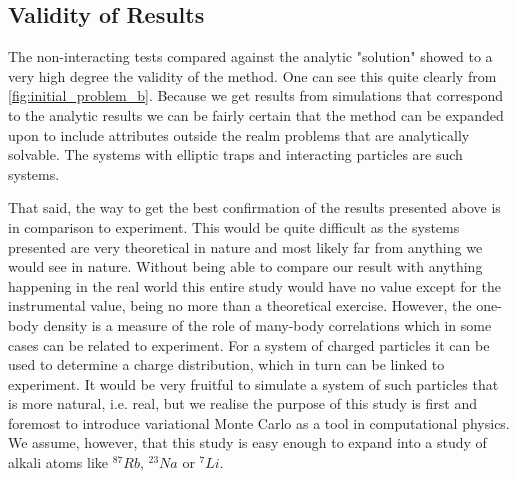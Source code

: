 \documentclass[
    a4paper, aps, twocolumn, floatfix, superscriptaddress,
    nofootinbib]{revtex4-1}
\newcommand{\1}{\mathds{1}}
\begin{document}
    \subsection{Validity of Results}
        The non-interacting tests compared against the analytic "solution"
        showed to a very high degree the validity of the method. One can see
        this quite clearly from \autoref{fig:initial_problem_b}. Because we get
        results from simulations that correspond to the analytic results we can
        be fairly certain that the method can be expanded upon to include
        attributes outside the realm problems that are analytically solvable.
        The systems with elliptic traps and interacting particles are such
        systems.

        That said, the way to get the best confirmation of the results presented
        above is in comparison to experiment. This would be quite difficult
        as the systems presented are very theoretical in nature and most likely
        far from anything we would see in nature. Without being able to compare
        our result with anything happening in the real world this entire study would
        have no value except for the instrumental value, being no more than
        a theoretical exercise.  However, the one-body
        density is a measure of the role of many-body correlations which in
        some cases can be related to experiment. For a system of charged
        particles it can be used to determine a charge distribution, which in
        turn can be linked to experiment. It would be very fruitful to simulate a
        system of such particles that is more natural, i.e. real, but we realise the
        purpose of this study is first and foremost to introduce variational
        Monte Carlo as a tool in computational physics. We assume, however,
        that this study is easy enough to expand into a study of alkali atoms like
        $^{87}Rb$, $^{23}Na$ or $^7Li$.
\end{document}
